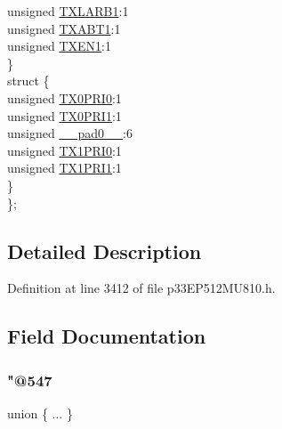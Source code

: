 \begin{DoxyCompactItemize}
\begin{tabbing}
\>\>unsigned \hyperlink{structtag_c1_t_r01_c_o_n_b_i_t_s_a468bd2237b3f0a8869bbd5cef0b996c9}{TXLARB1}:1\\
\>\>unsigned \hyperlink{structtag_c1_t_r01_c_o_n_b_i_t_s_a8ff9c4b1b81fd7ec4172261ab6fa1741}{TXABT1}:1\\
\>\>unsigned \hyperlink{structtag_c1_t_r01_c_o_n_b_i_t_s_ab8e4fce373a420fc90c53175f76e693e}{TXEN1}:1\\
\>\} \\
\>struct \{\\
\>\>unsigned \hyperlink{structtag_c1_t_r01_c_o_n_b_i_t_s_a89d7855315c29b4f35c810f3d352ba88}{TX0PRI0}:1\\
\>\>unsigned \hyperlink{structtag_c1_t_r01_c_o_n_b_i_t_s_a6c10142f674b5a8e8b8028e92876c78c}{TX0PRI1}:1\\
\>\>unsigned \hyperlink{structtag_c1_t_r01_c_o_n_b_i_t_s_adf71f3d8410c1f1dbbc96680a92c49af}{\_\_pad0\_\_}:6\\
\>\>unsigned \hyperlink{structtag_c1_t_r01_c_o_n_b_i_t_s_ac484a0ec095bc41f61eecdbb771dc490}{TX1PRI0}:1\\
\>\>unsigned \hyperlink{structtag_c1_t_r01_c_o_n_b_i_t_s_a81407c826a28b04b9810f5b2757f6c98}{TX1PRI1}:1\\
\>\} \\
\}; \\

\end{tabbing}\end{DoxyCompactItemize}


\subsection{Detailed Description}


Definition at line 3412 of file p33\+E\+P512\+M\+U810.\+h.



\subsection{Field Documentation}
\mbox{\label{structtag_c1_t_r01_c_o_n_b_i_t_s_aff63f3f03f4be807eac83b67f2fa74f5}} 
\subsubsection{\texorpdfstring{"@547}{@547}}
{\footnotesize\ttfamily union \{ ... \} }

\mbox{\label{structtag_c1_t_r01_c_o_n_b_i_t_s_adf71f3d8410c1f1dbbc96680a92c49af}} 
